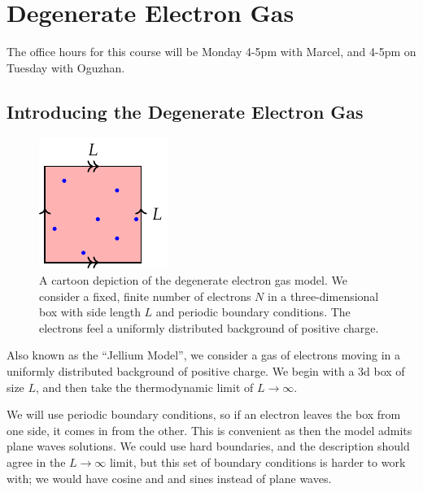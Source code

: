 \section{Degenerate Electron Gas}
The office hours for this course will be Monday 4-5pm with Marcel, and 4-5pm on Tuesday with Oguzhan.

\subsection{Introducing the Degenerate Electron Gas}
\begin{figure}[htbp]
    \centering
    \includegraphics[]{Images/fig-jelliumcartoon.pdf}
    
    \caption{A cartoon depiction of the degenerate electron gas model. We consider a fixed, finite number of electrons $N$ in a three-dimensional box with side length $L$ and periodic boundary conditions. The electrons feel a uniformly distributed background of positive charge.}
    \label{fig-jelliumcartoon}
\end{figure}
Also known as the ``Jellium Model'', we consider a gas of electrons moving in a uniformly distributed background of positive charge. We begin with a 3d box of size $L$, and then take the thermodynamic limit of $L \to \infty$. 

We will use periodic boundary conditions, so if an electron leaves the box from one side, it comes in from the other. This is convenient as then the model admits plane waves solutions. We could use hard boundaries, and the description should agree in the $L \to \infty$ limit, but this set of boundary conditions is harder to work with; we would have cosine and and sines instead of plane waves.

